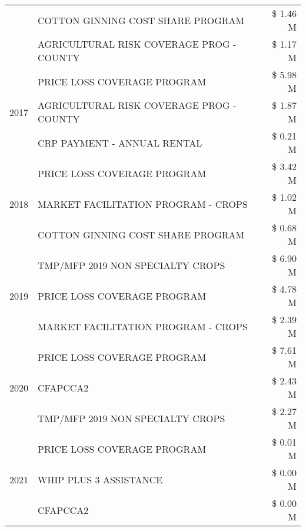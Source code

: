 \begin{tabular}{llr}
 & COTTON GINNING COST SHARE PROGRAM & \$ 1.46 M \\
 & AGRICULTURAL RISK COVERAGE PROG - COUNTY & \$ 1.17 M \\
\cline{1-3}
\multirow[t]{3}{*}{2017} & PRICE LOSS COVERAGE PROGRAM & \$ 5.98 M \\
 & AGRICULTURAL RISK COVERAGE PROG - COUNTY & \$ 1.87 M \\
 & CRP PAYMENT - ANNUAL RENTAL & \$ 0.21 M \\
\cline{1-3}
\multirow[t]{3}{*}{2018} & PRICE LOSS COVERAGE PROGRAM & \$ 3.42 M \\
 & MARKET FACILITATION PROGRAM - CROPS & \$ 1.02 M \\
 & COTTON GINNING COST SHARE PROGRAM & \$ 0.68 M \\
\cline{1-3}
\multirow[t]{3}{*}{2019} & TMP/MFP 2019 NON SPECIALTY CROPS & \$ 6.90 M \\
 & PRICE LOSS COVERAGE PROGRAM & \$ 4.78 M \\
 & MARKET FACILITATION PROGRAM - CROPS & \$ 2.39 M \\
\cline{1-3}
\multirow[t]{3}{*}{2020} & PRICE LOSS COVERAGE PROGRAM & \$ 7.61 M \\
 & CFAPCCA2 & \$ 2.43 M \\
 & TMP/MFP 2019 NON SPECIALTY CROPS & \$ 2.27 M \\
\cline{1-3}
\multirow[t]{3}{*}{2021} & PRICE LOSS COVERAGE PROGRAM & \$ 0.01 M \\
 & WHIP PLUS 3 ASSISTANCE & \$ 0.00 M \\
 & CFAPCCA2 & \$ 0.00 M \\
\cline{1-3}
\bottomrule
\end{tabular}
